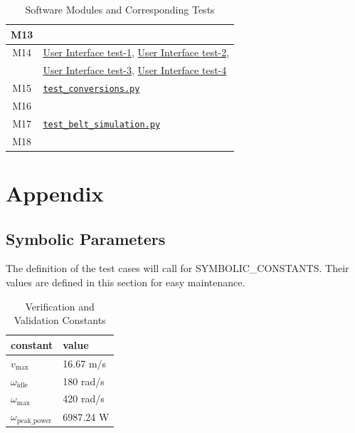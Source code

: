 \documentclass[12pt, titlepage]{article}
\begin{document}
\begin{table}[H]
\begin{tabular}{|c|p{10cm}|}
      M13 &  \\ \hline
      M14 & \textcolor{blue}{\hyperlink{User Interface test-1}{User Interface test-1}}, \textcolor{blue}{\hyperlink{User Interface test-2}{User Interface test-2}}, \\ & \textcolor{blue}{\hyperlink{User Interface test-3}{User Interface test-3}}, \textcolor{blue}{\hyperlink{User Interface test-4}{User Interface test-4}} \\ \hline
      M15 &  \hyperref[test:conversions]{\texttt{test\_conversions.py}}\\ \hline
      M16 & \\ \hline
      M17 & \hyperref[test:simulation_result]{\texttt{test\_belt\_simulation.py}} \\ \hline
      M18 &  \\ \hline
  \end{tabular}
  \caption{Software Modules and Corresponding Tests}
  \label{tab:modules_tests}
\end{table}






\newpage

\section{Appendix}

\subsection{Symbolic Parameters}

The definition of the test cases will call for SYMBOLIC\_CONSTANTS.
Their values are defined in this section for easy maintenance.

\begin{table}[h]
  \raggedright
  \begin{tabular}{l l} 
    \toprule		
    \textbf{constant} & \textbf{value}\\
    \midrule
    $v_\text{max}$ & 16.67 m/s \\
    $\omega_{\text{idle}}$ & 180 rad/s \\
    $\omega_\text{max}$ & 420 rad/s \\
    $\omega_\text{peak\_power}$ & 6987.24 W \\
    \bottomrule
  \end{tabular}
  \caption{Verification and Validation Constants}
  \label{tab:vnv_constants}
\end{table}
\end{document}
